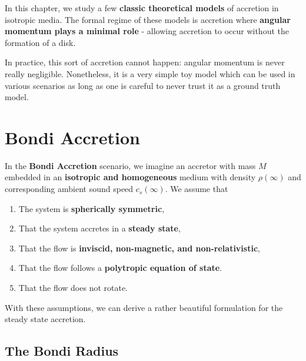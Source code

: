 In this chapter, we study a few \textbf{classic theoretical models} of accretion in isotropic media. The formal regime of these models is accretion where \textbf{angular momentum plays a minimal role} - allowing accretion to occur without the formation of a disk.
\par
In practice, this sort of accretion cannot happen: angular momentum is never really negligible. Nonetheless, it is a very simple toy model which can be used in various scenarios as long as one is careful to never trust it as a ground truth model.

\section{Bondi Accretion}

In the \textbf{Bondi Accretion} scenario, we imagine an accretor with mass $M$ embedded in an \textbf{isotropic and homogeneous} medium with density $\rho(\infty)$ and corresponding ambient sound speed $c_s(\infty)$. We assume that

\begin{enumerate}
    \item The system is \textbf{spherically symmetric},
    \item That the system accretes in a \textbf{steady state},
    \item That the flow is \textbf{inviscid, non-magnetic, and non-relativistic},
    \item That the flow follows a \textbf{polytropic equation of state}.
    \item That the flow does not rotate.
\end{enumerate}

With these assumptions, we can derive a rather beautiful formulation for the steady state accretion.

\subsection{The Bondi Radius}


